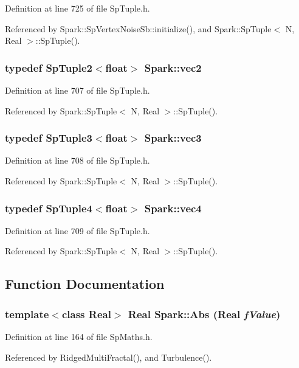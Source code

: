 Definition at line 725 of file Sp\-Tuple.h.

Referenced by Spark::Sp\-Vertex\-Noise\-Sb::initialize(), and Spark::Sp\-Tuple$<$ N, Real $>$::Sp\-Tuple().
\subsubsection{\setlength{\rightskip}{0pt plus 5cm}typedef {\bf Sp\-Tuple2}$<$float$>$ {\bf Spark::vec2}}\label{namespaceSpark_a7}


Definition at line 707 of file Sp\-Tuple.h.

Referenced by Spark::Sp\-Tuple$<$ N, Real $>$::Sp\-Tuple().
\subsubsection{\setlength{\rightskip}{0pt plus 5cm}typedef {\bf Sp\-Tuple3}$<$float$>$ {\bf Spark::vec3}}\label{namespaceSpark_a8}


Definition at line 708 of file Sp\-Tuple.h.

Referenced by Spark::Sp\-Tuple$<$ N, Real $>$::Sp\-Tuple().
\subsubsection{\setlength{\rightskip}{0pt plus 5cm}typedef {\bf Sp\-Tuple4}$<$float$>$ {\bf Spark::vec4}}\label{namespaceSpark_a9}


Definition at line 709 of file Sp\-Tuple.h.

Referenced by Spark::Sp\-Tuple$<$ N, Real $>$::Sp\-Tuple().

\subsection{Function Documentation}
\subsubsection{\setlength{\rightskip}{0pt plus 5cm}template$<$class Real$>$ Real Spark::Abs (Real {\em f\-Value})}\label{namespaceSpark_a40}


Definition at line 164 of file Sp\-Maths.h.

Referenced by Ridged\-Multi\-Fractal(), and Turbulence().
